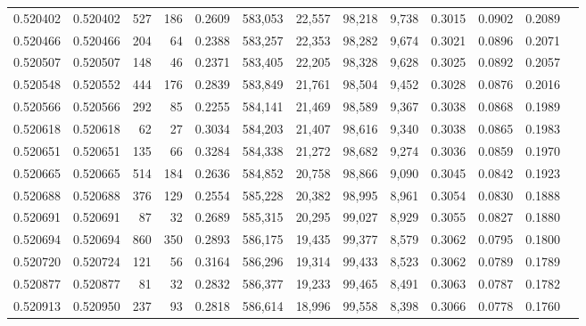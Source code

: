 \begin{tabular}{rrrrrrrrrrrrr}
0.520402 & 0.520402 &   527 &   186 &                                     0.2609 & 583,053 &  22,557 &  98,218 &   9,738 & 0.3015 & 0.0902 & 0.2089 \\
0.520466 & 0.520466 &   204 &    64 &                                     0.2388 & 583,257 &  22,353 &  98,282 &   9,674 & 0.3021 & 0.0896 & 0.2071 \\
0.520507 & 0.520507 &   148 &    46 &                                     0.2371 & 583,405 &  22,205 &  98,328 &   9,628 & 0.3025 & 0.0892 & 0.2057 \\
0.520548 & 0.520552 &   444 &   176 &                                     0.2839 & 583,849 &  21,761 &  98,504 &   9,452 & 0.3028 & 0.0876 & 0.2016 \\
0.520566 & 0.520566 &   292 &    85 &                                     0.2255 & 584,141 &  21,469 &  98,589 &   9,367 & 0.3038 & 0.0868 & 0.1989 \\
0.520618 & 0.520618 &    62 &    27 &                                     0.3034 & 584,203 &  21,407 &  98,616 &   9,340 & 0.3038 & 0.0865 & 0.1983 \\
0.520651 & 0.520651 &   135 &    66 &                                     0.3284 & 584,338 &  21,272 &  98,682 &   9,274 & 0.3036 & 0.0859 & 0.1970 \\
0.520665 & 0.520665 &   514 &   184 &                                     0.2636 & 584,852 &  20,758 &  98,866 &   9,090 & 0.3045 & 0.0842 & 0.1923 \\
0.520688 & 0.520688 &   376 &   129 &                                     0.2554 & 585,228 &  20,382 &  98,995 &   8,961 & 0.3054 & 0.0830 & 0.1888 \\
0.520691 & 0.520691 &    87 &    32 &                                     0.2689 & 585,315 &  20,295 &  99,027 &   8,929 & 0.3055 & 0.0827 & 0.1880 \\
0.520694 & 0.520694 &   860 &   350 &                                     0.2893 & 586,175 &  19,435 &  99,377 &   8,579 & 0.3062 & 0.0795 & 0.1800 \\
0.520720 & 0.520724 &   121 &    56 &                                     0.3164 & 586,296 &  19,314 &  99,433 &   8,523 & 0.3062 & 0.0789 & 0.1789 \\
0.520877 & 0.520877 &    81 &    32 &                                     0.2832 & 586,377 &  19,233 &  99,465 &   8,491 & 0.3063 & 0.0787 & 0.1782 \\
0.520913 & 0.520950 &   237 &    93 &                                     0.2818 & 586,614 &  18,996 &  99,558 &   8,398 & 0.3066 & 0.0778 & 0.1760 \\

\end{tabular}
